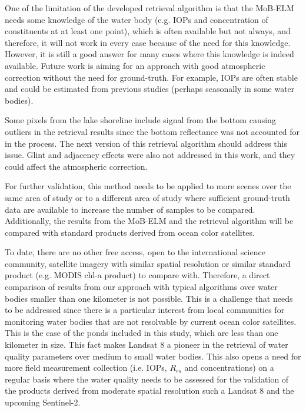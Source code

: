\documentclass[onecolumn,3p,letterpaper]{elsarticle}
\begin{document}

One of the limitation of the developed retrieval algorithm is that the MoB-ELM needs some knowledge of the water body (e.g. IOPs and concentration of constituents at at least one point), which is often available but not always, and therefore, it will not work in every case because of the need for this knowledge. However, it is still a good answer for many cases where this knowledge is indeed available. Future work is aiming for an approach with good atmospheric correction without the need for ground-truth. For example, IOPs are often stable and could be estimated from previous studies (perhaps seasonally in some water bodies).

Some pixels from the lake shoreline include signal from the bottom causing outliers in the retrieval results since the bottom reflectance was not accounted for in the process. The next version of this retrieval algorithm should address this issue. Glint and adjacency effects were also not addressed in this work, and they could affect the atmospheric correction.

For further validation, this method needs to be applied to more scenes over the same area of study or to a different area of study where sufficient ground-truth data are available to increase the number of samples to be compared. Additionally, the results from the MoB-ELM and the retrieval algorithm will be compared with standard products derived from ocean color satellites.

To date, there are no other free access, open to the international science community, satellite imagery with similar spatial resolution or similar standard product (e.g. MODIS chl-a product) to compare with. Therefore, a direct comparison of results from our approach with typical algorithms over water bodies smaller than one kilometer is not possible. This is a challenge that needs to be addressed since there is a particular interest from local communities for monitoring water bodies that are not resolvable by current ocean color satellites. This is the case of the ponds included in this study, which are less than one kilometer in size. This fact makes Landsat 8 a pioneer in the retrieval of water quality parameters over medium to small water bodies. This also opens a need for more field measurement collection (i.e. IOPs, $R_{rs}$ and concentrations) on a regular basis where the water quality needs to be assessed for the validation of the products derived from moderate spatial resolution such a Landsat 8 and the upcoming Sentinel-2. 
\end{document}
